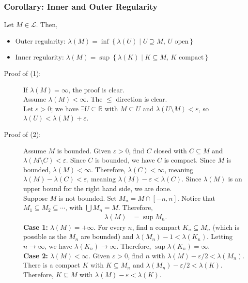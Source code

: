 \documentclass[9pt]{extarticle}
\newcommand{\R}{\mathbb{R}}
\begin{document}
  \subsubsection{Corollary: Inner and Outer Regularity}%
  Let $M\in \mathcal{L}$. Then,
  \begin{itemize}
    \item Outer regularity: $\displaystyle \lambda(M) = \inf\left\{\lambda(U)\mid U\supseteq M,~U\text{ open}\right\}$
    \item Inner regularity: $\displaystyle \lambda(M) = \sup\left\{\lambda(K)\mid K\subseteq M,~K\text{ compact}\right\}$
  \end{itemize}
  \begin{description}
    \item[Proof of (1):] If $\lambda(M) = \infty$, the proof is clear.\\

      Assume $\lambda(M) < \infty$. The $\leq$ direction is clear.\\

      Let $\varepsilon > 0$; we have $\exists U\subseteq \R$ with $M\subseteq U$ and $\lambda(U\setminus M) < \varepsilon$, so $\lambda(U) < \lambda(M) + \varepsilon$.
    \item[Proof of (2):] Assume $M$ is bounded. Given $\varepsilon > 0$, find $C$ closed with $C\subseteq M$ and $\lambda(M\setminus C) < \varepsilon$. Since $C$ is bounded, we have $C$ is compact. Since $M$ is bounded, $\lambda(M) < \infty$. Therefore, $\lambda(C) < \infty$, meaning $\lambda(M) - \lambda(C) < \varepsilon$, meaning $\lambda(M) - \varepsilon < \lambda(C)$. Since $\lambda(M)$ is an upper bound for the right hand side, we are done.\\

      Suppose $M$ is not bounded. Set $M_n = M\cap [-n,n]$. Notice that $M_1 \subseteq M_2 \subseteq \cdots$, with $\bigcup M_n = M$. Therefore,
      \begin{align*}
        \lambda(M) &= \sup M_n.
      \end{align*}
      \textbf{Case 1:} $\lambda(M) = +\infty$. For every $n$, find a compact $K_n\subseteq M_n$ (which is possible as the $M_n$ are bounded) and $\lambda(M_n) - 1 < \lambda(K_n)$. Letting $n\rightarrow \infty$, we have $\lambda(K_n) \rightarrow \infty$. Therefore, $\sup \lambda(K_n) = \infty$.\\

      \textbf{Case 2:} $\lambda(M) < \infty$. Given $\varepsilon > 0$, find $n$ with $\lambda(M) - \varepsilon/2 < \lambda(M_n)$. There is a compact $K$ with $K\subseteq M_n$ and $\lambda(M_n) - \varepsilon/2 < \lambda(K)$. Therefore, $K\subseteq M$ with $\lambda(M) - \varepsilon < \lambda(K)$.
  \end{description}
\end{document}

